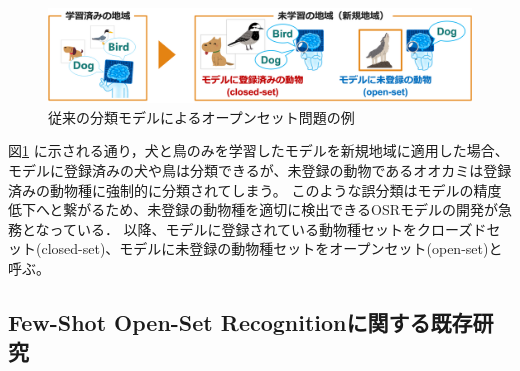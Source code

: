 \documentclass[a4paper,11pt,nomag]{jsreport}
\begin{document}
\begin{figure}[tbp]
  \centering
  \includegraphics[width=\linewidth, keepaspectratio]{image/non_osr.png}
  \caption{従来の分類モデルによるオープンセット問題の例}
  \label{fig:non_osr}
\end{figure}

図\ref{fig:non_osr} に示される通り，犬と鳥のみを学習したモデルを新規地域に適用した場合、モデルに登録済みの犬や鳥は分類できるが、未登録の動物であるオオカミは登録済みの動物種に強制的に分類されてしまう。
このような誤分類はモデルの精度低下へと繋がるため、未登録の動物種を適切に検出できるOSRモデルの開発が急務となっている．
以降、モデルに登録されている動物種セットをクローズドセット(closed-set)、モデルに未登録の動物種セットをオープンセット(open-set)と呼ぶ。


\subsection{Few-Shot Open-Set Recognitionに関する既存研究}






\end{document}

